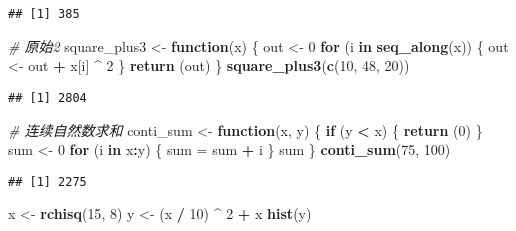 \documentclass[
]{article}
\newenvironment{Shaded}{\begin{snugshade}}{\end{snugshade}}
\newcommand{\CommentTok}[1]{\textcolor[rgb]{0.56,0.35,0.01}{\textit{#1}}}
\newcommand{\ControlFlowTok}[1]{\textcolor[rgb]{0.13,0.29,0.53}{\textbf{#1}}}
\newcommand{\DecValTok}[1]{\textcolor[rgb]{0.00,0.00,0.81}{#1}}
\newcommand{\FunctionTok}[1]{\textcolor[rgb]{0.13,0.29,0.53}{\textbf{#1}}}
\newcommand{\NormalTok}[1]{#1}
\newcommand{\OtherTok}[1]{\textcolor[rgb]{0.56,0.35,0.01}{#1}}
\newcommand{\SpecialCharTok}[1]{\textcolor[rgb]{0.81,0.36,0.00}{\textbf{#1}}}
\begin{document}
\begin{verbatim}
## [1] 385
\end{verbatim}

\begin{Shaded}
\begin{Highlighting}[]
\CommentTok{\# 原始2}
\NormalTok{square\_plus3 }\OtherTok{\textless{}{-}} \ControlFlowTok{function}\NormalTok{(x) \{}
\NormalTok{  out }\OtherTok{\textless{}{-}} \DecValTok{0}
  \ControlFlowTok{for}\NormalTok{ (i }\ControlFlowTok{in} \FunctionTok{seq\_along}\NormalTok{(x)) \{}
\NormalTok{    out }\OtherTok{\textless{}{-}}\NormalTok{ out }\SpecialCharTok{+}\NormalTok{ x[i] }\SpecialCharTok{\^{}} \DecValTok{2}
\NormalTok{  \}}
  \FunctionTok{return}\NormalTok{ (out)}
\NormalTok{\}}
\FunctionTok{square\_plus3}\NormalTok{(}\FunctionTok{c}\NormalTok{(}\DecValTok{10}\NormalTok{, }\DecValTok{48}\NormalTok{, }\DecValTok{20}\NormalTok{))}
\end{Highlighting}
\end{Shaded}

\begin{verbatim}
## [1] 2804
\end{verbatim}

\begin{Shaded}
\begin{Highlighting}[]
\CommentTok{\# 连续自然数求和}
\NormalTok{conti\_sum }\OtherTok{\textless{}{-}} \ControlFlowTok{function}\NormalTok{(x, y) \{}
  \ControlFlowTok{if}\NormalTok{ (y }\SpecialCharTok{\textless{}}\NormalTok{ x) \{}
    \FunctionTok{return}\NormalTok{ (}\DecValTok{0}\NormalTok{)}
\NormalTok{  \}}
\NormalTok{  sum }\OtherTok{\textless{}{-}} \DecValTok{0}
  \ControlFlowTok{for}\NormalTok{ (i }\ControlFlowTok{in}\NormalTok{ x}\SpecialCharTok{:}\NormalTok{y) \{}
\NormalTok{    sum }\OtherTok{=}\NormalTok{ sum }\SpecialCharTok{+}\NormalTok{ i}
\NormalTok{  \}}
\NormalTok{  sum}
\NormalTok{\}}
\FunctionTok{conti\_sum}\NormalTok{(}\DecValTok{75}\NormalTok{, }\DecValTok{100}\NormalTok{)}
\end{Highlighting}
\end{Shaded}

\begin{verbatim}
## [1] 2275
\end{verbatim}

\begin{Shaded}
\begin{Highlighting}[]
\NormalTok{x }\OtherTok{\textless{}{-}} \FunctionTok{rchisq}\NormalTok{(}\DecValTok{15}\NormalTok{, }\DecValTok{8}\NormalTok{)}
\NormalTok{y }\OtherTok{\textless{}{-}}\NormalTok{ (x }\SpecialCharTok{/} \DecValTok{10}\NormalTok{) }\SpecialCharTok{\^{}} \DecValTok{2} \SpecialCharTok{+}\NormalTok{ x}
\FunctionTok{hist}\NormalTok{(y)}
\end{Highlighting}
\end{Shaded}
\end{document}
